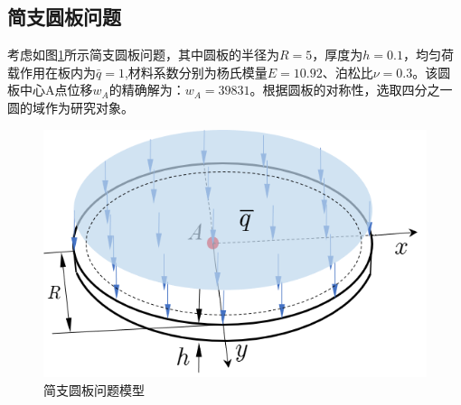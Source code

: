 \clearpage
\subsection{简支圆板问题}
考虑如图\ref{ch_5:fig:Circular}所示简支圆板问题，其中圆板的半径为$R=5$，厚度为$h=0.1$，均匀荷载作用在板内为$\bar{q}=1$,材料系数分别为杨氏模量$E=10.92$、泊松比$\nu=0.3$。该圆板中心A点位移$w_A$的精确解为：$w_A=39831$。根据圆板的对称性，选取四分之一圆的域作为研究对象。

\begin{figure}[!h]
    \centering 
        \includegraphics[scale=0.8]{figures/ch_5/Circular.png}
        \caption{简支圆板问题模型}\label{ch_5:fig:Circular}
\end{figure}

